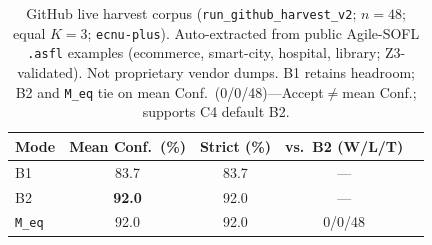 \begin{table}[t]
  \centering
  \caption{GitHub live harvest corpus
    (\texttt{run\_github\_harvest\_v2}; $n{=}48$; equal $K{=}3$;
    \texttt{ecnu-plus}).
    Auto-extracted from public Agile-SOFL \texttt{.asfl} examples
    (ecommerce, smart-city, hospital, library; Z3-validated).
    Not proprietary vendor dumps. B1 retains headroom; B2 and \texttt{M\_eq}
    tie on mean Conf.\ (0/0/48)---Accept$\neq$mean Conf.; supports C4 default B2.}
  \label{tab:github-harvest}
  \footnotesize
  \begin{tabular}{lcccc}
    \toprule
    Mode & Mean Conf.\ (\%) & Strict (\%) & vs.\ B2 (W/L/T) \\
    \midrule
    B1 & 83.7 & 83.7 & --- \\
    B2 & \textbf{92.0} & 92.0 & --- \\
    \texttt{M\_eq} & 92.0 & 92.0 & 0/0/48 \\
    \bottomrule
  \end{tabular}
\end{table}
